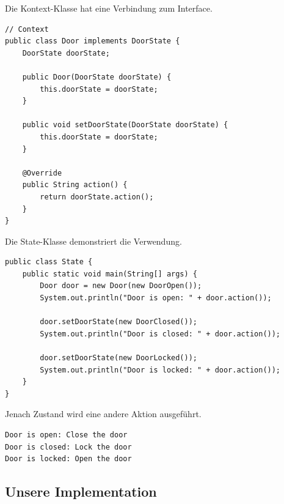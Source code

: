 \documentclass[10pt,a4paper]{article}
\begin{document}
%
Die Kontext-Klasse hat eine Verbindung zum Interface.
%
\begin{lstlisting}[caption={Context}]
// Context
public class Door implements DoorState {
	DoorState doorState;

	public Door(DoorState doorState) {
		this.doorState = doorState;
	}

	public void setDoorState(DoorState doorState) {
		this.doorState = doorState;
	}
	
	@Override
	public String action() {
		return doorState.action();
	}
}
\end{lstlisting}
%
Die State-Klasse demonstriert die Verwendung.
%
\begin{lstlisting}[caption={State-Klasse}]
public class State {
	public static void main(String[] args) {
		Door door = new Door(new DoorOpen());
		System.out.println("Door is open: " + door.action());
		
		door.setDoorState(new DoorClosed());
		System.out.println("Door is closed: " + door.action());

		door.setDoorState(new DoorLocked());
		System.out.println("Door is locked: " + door.action());
	}
}
\end{lstlisting}
%
Jenach Zustand wird eine andere Aktion ausgeführt.
%
\begin{lstlisting}[caption={Context}]
Door is open: Close the door
Door is closed: Lock the door
Door is locked: Open the door
\end{lstlisting}
%
\subsection*{Unsere Implementation}
%

%
\end{document}
